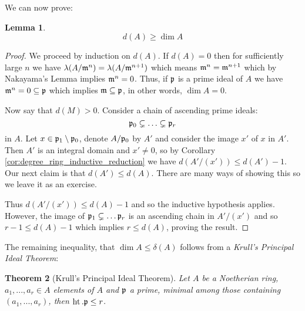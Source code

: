 \documentclass[12pt]{article}
\theoremstyle{plain}
\newtheorem{thm}{Theorem}[subsection] %
\newtheorem{lemma}[thm]{Lemma}
\theoremstyle{definition}
\begin{document}
	We can now prove:
	\begin{lemma}
		\[d(A) \geq \operatorname{dim}A\]
	\end{lemma}
	\begin{proof}
		We proceed by induction on $d(A)$. If $d(A) = 0$ then for sufficiently large $n$ we have $\lambda(A/\frak{m}^n) = \lambda(A/\frak{m}^{n+1})$ which means $\frak{m}^n = \frak{m}^{n+1}$ which by Nakayama's Lemma implies $\frak{m}^n = 0$. Thus, if $\frak{p}$ is a prime ideal of $A$ we have $\frak{m}^n = 0 \subseteq \frak{p}$ which implies $\frak{m} \subseteq \frak{p}$, in other words, $\operatorname{dim}A = 0$.
		
		Now say that $d(M) > 0$. Consider a chain of ascending prime ideals:
		\[\frak{p}_0 \subsetneq \hdots \subsetneq \frak{p}_r\]
		in $A$. Let $x \in \frak{p}_1\setminus\frak{p}_0$, denote $A/\frak{p}_0$ by $A'$ and consider the image $x'$ of $x$ in $A'$. Then $A'$ is an integral domain and $x' \neq 0$, so by Corollary \ref{cor:degree_ring_inductive_reduction} we have $d(A'/(x')) \leq d(A') - 1$. Our next claim is that $d(A') \leq d(A)$. There are many ways of showing this so we leave it as an exercise.
		
		Thus $d(A'/(x')) \leq d(A) - 1$ and so the inductive hypothesis applies. However, the image of $\frak{p}_1 \subsetneq \hdots \frak{p}_r$ is an ascending chain in $A'/(x')$ and so $r - 1 \leq d(A) - 1$ which implies $r \leq d(A)$, proving the result.
	\end{proof}
	The remaining inequality, that $\operatorname{dim}A \leq \delta(A)$ follows from a \emph{Krull's Principal Ideal Theorem}:
	\begin{thm}[Krull's Principal Ideal Theorem]
		Let $A$ be a Noetherian ring, $a_1,...,a_r \in A$ elements of $A$ and $\frak{p}$ a  prime, minimal among those containing $(a_1,...,a_r)$, then $\operatorname{ht}.\frak{p} \leq r$.
	\end{thm}
\end{document}
